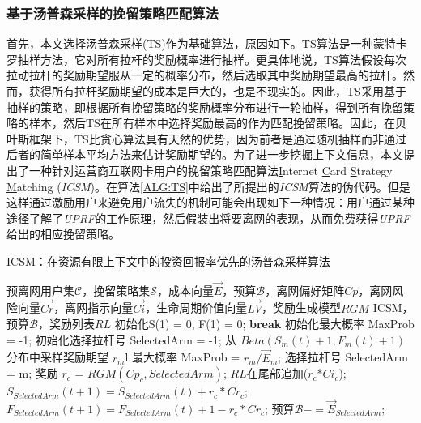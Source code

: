 \subsubsection{基于汤普森采样的挽留策略匹配算法}
	首先，本文选择汤普森采样(TS)作为基础算法，原因如下。TS算法是一种蒙特卡罗抽样方法，它对所有拉杆的奖励概率进行抽样。更具体地说，TS算法假设每次拉动拉杆的奖励期望服从一定的概率分布，然后选取其中奖励期望最高的拉杆。然而，获得所有拉杆奖励期望的成本是巨大的，也是不现实的。因此，TS采用基于抽样的策略，即根据所有挽留策略的奖励概率分布进行一轮抽样，得到所有挽留策略的样本，然后TS在所有样本中选择奖励最高的作为匹配挽留策略。因此，在贝叶斯框架下，TS比贪心算法具有天然的优势，因为前者是通过随机抽样而非通过后者的简单样本平均方法来估计奖励期望的。为了进一步挖掘上下文信息，本文提出了一种针对运营商互联网卡用户的挽留策略匹配算法\underline{I}nternet \underline{C}ard \underline{S}trategy \underline{M}atching (\emph{ICSM})。在算法\ref{ALG:TS}中给出了所提出的\emph{ICSM}算法的伪代码。但是这样通过激励用户来避免用户流失的机制可能会出现如下一种情况：用户通过某种途径了解了\emph{UPRF}的工作原理，然后假装出将要离网的表现，从而免费获得\emph{UPRF}给出的相应挽留策略。
	
\begin{algorithm}
	\caption{ICSM：在资源有限上下文中的投资回报率优先的汤普森采样算法}
	\label{ALG:TS}
	\renewcommand{\algorithmicrequire}{\textbf{Input:}}
	\renewcommand{\algorithmicensure}{\textbf{Output:}}
	
	\begin{algorithmic}[1]
		\REQUIRE 预离网用户集$\mathcal{C}$，挽留策略集$\mathcal{S}$，成本向量$\vec{E}$，预算$\mathcal{B}$，离网偏好矩阵$Cp$，离网风险向量$\vec{Cr}$，离网指示向量$\vec{Ci}$，生命周期价值向量$\vec{LV}$，奖励生成模型${RGM}$
		\ENSURE ICSM，预算$\mathcal{B}$，奖励列表$RL$
		\STATE 初始化S(1) = 0, F(1) = 0;
		\STATE \textbf{break}
		\ELSE
		\STATE 初始化最大概率 MaxProb = -1;
		\STATE 初始化选择拉杆号 SelectedArm = -1;		
		\STATE 从 $Beta(S_{m}(t)+1, F_{m}(t)+1)$分布中采样奖励期望 $r_{m}$l
		\STATE 最大概率 MaxProb = $r_{m} / \vec{E}_{m}$;
		\STATE 选择拉杆号 SelectedArm = m;
		\ENDIF
		\ENDFOR
		\STATE 奖励 $r_c$ = $RGM(Cp_{c}, SelectedArm)$;
		\STATE $RL$在尾部追加($r_c$*$Ci_{c}$); %
		\STATE $S_{SelectedArm}(t+1) = S_{SelectedArm}(t) + r_c*Cr_{c}$;
		\STATE $F_{SelectedArm}(t+1) = F_{SelectedArm}(t) + 1 - r_c*Cr_{c}$; 
		\STATE 预算$\mathcal{B} -= \vec{E}_{SelectedArm}$;
		
		\ENDIF		
		\ENDFOR
		
	\end{algorithmic}
\end{algorithm}



